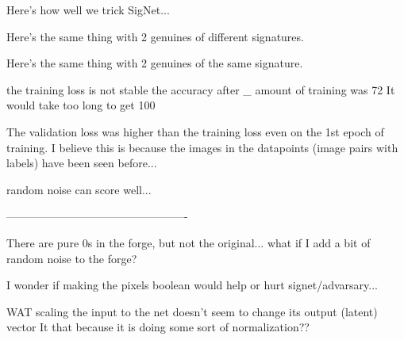 Here's how well we trick SigNet...

Here's the same thing with 2 genuines of different signatures.

Here's the same thing with 2 genuines of the same signature.


the training loss is not stable
the accuracy after \_ amount of training was 72%
It would take too long to get 100%

The validation loss was higher than the training loss even on the 1st epoch of training.
I believe this is because the images in the datapoints (image pairs with labels) have been seen before...


random noise can score well...

-------------------------------------------------

There are pure 0s in the forge, but not the original...
what if I add a bit of random noise to the forge?

I wonder if making the pixels boolean would help or hurt signet/advarsary...





WAT
    scaling the input to the net doesn't seem to change its output (latent) vector
    It that because it is doing some sort of normalization??
